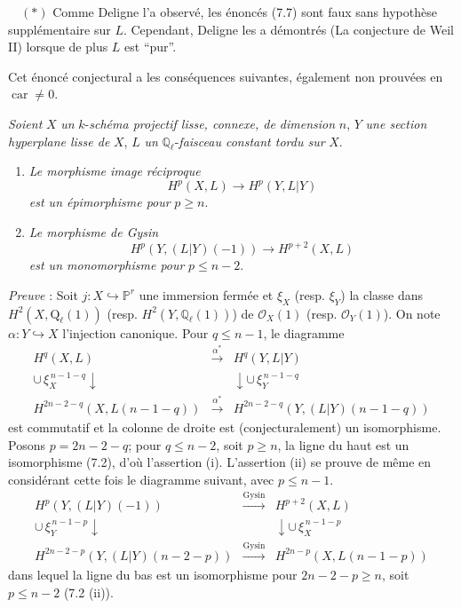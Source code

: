 \(\quad (*)\) Comme Deligne l'a observé, les énoncés (7.7) sont faux sans hypothèse supplémentaire sur $L$. Cependant, Deligne les a démontrés (La conjecture de Weil II) lorsque de plus $L$ est ``pur''.

Cet
énoncé conjectural a les conséquences suivantes, également non prouvées en $\operatorname{car}\ne0$.

\emph{Soient} $X$ \emph{un} $k$-\emph{schéma projectif lisse, connexe, de dimension} $n$, $Y$ \emph{une section hyperplane lisse de} $X$, $L$ \emph{un} $\mathbb{Q}_\ell$-\emph{faisceau constant tordu sur} $X$.
\begin{enumerate}[label=(\roman*)]
\item \emph{Le morphisme image réciproque}
\[
H^p(X,L)\to H^p(Y,L|Y)
\]
\emph{est un épimorphisme pour} $p\ge n$.
\item \emph{Le morphisme de Gysin}
\[
H^p(Y,(L|Y)(-1))\to H^{p+2}(X,L)
\]
\emph{est un monomorphisme pour} $p\le n-2$.
\end{enumerate}

\emph{Preuve} : Soit $j:X\hookrightarrow\mathbb{P}^r$ une immersion fermée et $\xi_X$ (resp. $\xi_Y$) la classe dans $H^2(X,\mathrm{Q}_\ell(1))$ (resp. $H^2(Y,\mathbb{Q}_\ell(1))$) de $\mathcal{O}_X(1)$ (resp. $\mathcal{O}_Y(1)$). On note $\alpha:Y\hookrightarrow X$ l'injection canonique. Pour $q\le n-1$, le diagramme
\[
\begin{array}{ccc}
H^q(X,L)&\xrightarrow{\alpha^*}&H^q(Y,L|Y)\\
\cup\,\xi_X^{\,n-1-q}\downarrow&&\downarrow\cup\,\xi_Y^{\,n-1-q}\\
H^{2n-2-q}(X,L(n-1-q))&\xrightarrow{\alpha^*}&
H^{2n-2-q}(Y,(L|Y)(n-1-q))
\end{array}
\]
est commutatif et la colonne de droite est (conjecturalement) un isomorphisme. Posons $p=2n-2-q$; pour $q\le n-2$, soit $p\ge n$, la ligne du haut est un isomorphisme (7.2), d'où l'assertion (i). L'assertion (ii) se prouve de même en considérant cette fois le diagramme suivant, avec $p\le n-1$.
\[
\begin{array}{ccc}
H^p(Y,(L|Y)(-1))&
\xrightarrow{\mathrm{Gysin}}&H^{p+2}(X,L)\\
\cup\,\xi_Y^{\,n-1-p}\downarrow&&\downarrow\cup\,\xi_X^{\,n-1-p}\\
H^{2n-2-p}(Y,(L|Y)(n-2-p))&\xrightarrow{\mathrm{Gysin}}&
H^{2n-p}(X,L(n-1-p))
\end{array}
\]
dans lequel la ligne du bas est un isomorphisme pour $2n-2-p\ge n$, soit $p\le n-2$ (7.2 (ii)).

